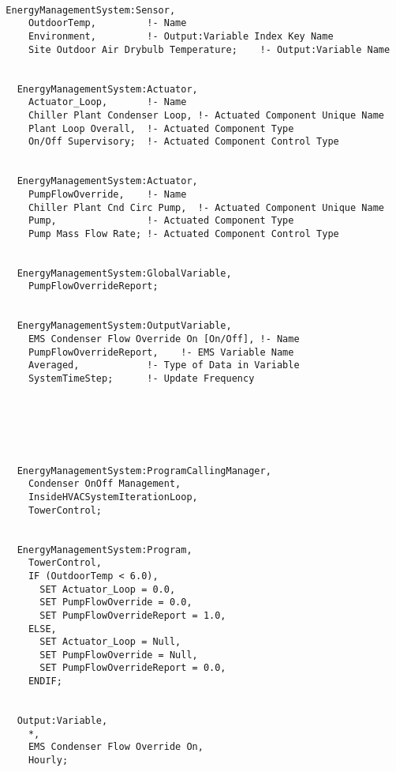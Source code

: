 \begin{lstlisting}

  EnergyManagementSystem:Sensor,
      OutdoorTemp,         !- Name
      Environment,         !- Output:Variable Index Key Name
      Site Outdoor Air Drybulb Temperature;    !- Output:Variable Name


    EnergyManagementSystem:Actuator,
      Actuator_Loop,       !- Name
      Chiller Plant Condenser Loop, !- Actuated Component Unique Name
      Plant Loop Overall,  !- Actuated Component Type
      On/Off Supervisory;  !- Actuated Component Control Type


    EnergyManagementSystem:Actuator,
      PumpFlowOverride,    !- Name
      Chiller Plant Cnd Circ Pump,  !- Actuated Component Unique Name
      Pump,                !- Actuated Component Type
      Pump Mass Flow Rate; !- Actuated Component Control Type


    EnergyManagementSystem:GlobalVariable,
      PumpFlowOverrideReport;


    EnergyManagementSystem:OutputVariable,
      EMS Condenser Flow Override On [On/Off], !- Name
      PumpFlowOverrideReport,    !- EMS Variable Name
      Averaged,            !- Type of Data in Variable
      SystemTimeStep;      !- Update Frequency






    EnergyManagementSystem:ProgramCallingManager,
      Condenser OnOff Management,
      InsideHVACSystemIterationLoop,
      TowerControl;


    EnergyManagementSystem:Program,
      TowerControl,
      IF (OutdoorTemp < 6.0),
        SET Actuator_Loop = 0.0,
        SET PumpFlowOverride = 0.0,
        SET PumpFlowOverrideReport = 1.0,
      ELSE,
        SET Actuator_Loop = Null,
        SET PumpFlowOverride = Null,
        SET PumpFlowOverrideReport = 0.0,
      ENDIF;


    Output:Variable,
      *,
      EMS Condenser Flow Override On,
      Hourly;
\end{lstlisting}
